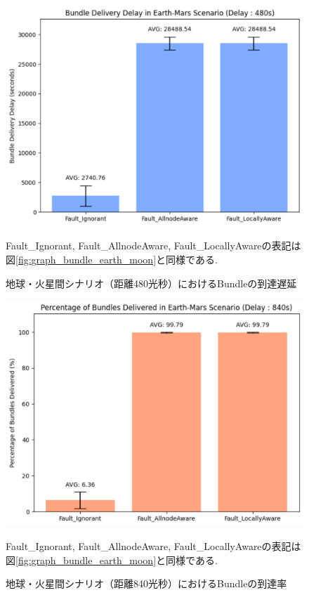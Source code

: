 \begin{figure}[tbh]
    \centering
    \includegraphics[width=0.7\textheight]{img/mars_480_delay.pdf}
    \caption{地球・火星間シナリオ（距離480光秒）におけるBundleの到達遅延}
    \label{fig:graph_delay_earth_mars_480}
    \begin{minipage}{\textwidth}
        \centering
        \vspace{3mm}
        \fontsize{10.5pt}{12pt}\selectfont
        Fault\_Ignorant, Fault\_AllnodeAware, Fault\_LocallyAwareの表記は
        図\ref{fig:graph_bundle_earth_moon}と同様である.
    \end{minipage}
\end{figure}

\begin{figure}[tbh]
    \centering
    \includegraphics[width=0.7\textheight]{img/mars_840_bundle.pdf}
    \caption{地球・火星間シナリオ（距離840光秒）におけるBundleの到達率}
    \label{fig:graph_bundle_earth_mars_840}
    \begin{minipage}{\textwidth}
        \centering
        \vspace{3mm}
        \fontsize{10.5pt}{12pt}\selectfont
        Fault\_Ignorant, Fault\_AllnodeAware, Fault\_LocallyAwareの表記は
        図\ref{fig:graph_bundle_earth_moon}と同様である.
    \end{minipage}
\end{figure}

